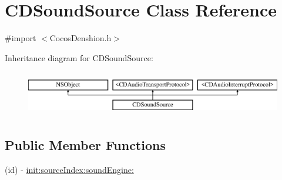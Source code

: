 \hypertarget{interface_c_d_sound_source}{\section{C\-D\-Sound\-Source Class Reference}
\label{interface_c_d_sound_source}
}


{\ttfamily \#import $<$Cocos\-Denshion.\-h$>$}

Inheritance diagram for C\-D\-Sound\-Source\-:\begin{figure}[H]
\begin{center}
\leavevmode
\includegraphics[height=2.000000cm]{interface_c_d_sound_source}
\end{center}
\end{figure}
\subsection*{Public Member Functions}
\begin{DoxyCompactItemize}
\item 
(id) -\/ \hyperlink{interface_c_d_sound_source_af84acea7ce4e447b3d7998a7d3ded6bf}{init\-:source\-Index\-:sound\-Engine\-:}
\end{DoxyCompactItemize}
